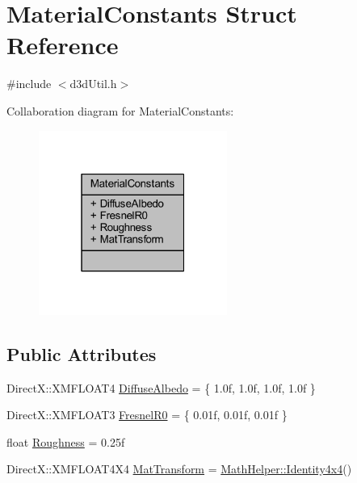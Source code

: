 \hypertarget{struct_material_constants}{}\section{Material\+Constants Struct Reference}
\label{struct_material_constants}


{\ttfamily \#include $<$d3d\+Util.\+h$>$}



Collaboration diagram for Material\+Constants\+:\nopagebreak
\begin{figure}[H]
\begin{center}
\leavevmode
\includegraphics[width=175pt]{struct_material_constants__coll__graph}
\end{center}
\end{figure}
\subsection*{Public Attributes}
\begin{DoxyCompactItemize}
\item 
Direct\+X\+::\+X\+M\+F\+L\+O\+A\+T4 \hyperlink{struct_material_constants_a83cf6d979493301808d0e4b350c3e0a4_a83cf6d979493301808d0e4b350c3e0a4}{Diffuse\+Albedo} = \{ 1.\+0f, 1.\+0f, 1.\+0f, 1.\+0f \}
\item 
Direct\+X\+::\+X\+M\+F\+L\+O\+A\+T3 \hyperlink{struct_material_constants_a7b2282a2a351b4327324fc7456a1cd85_a7b2282a2a351b4327324fc7456a1cd85}{Fresnel\+R0} = \{ 0.\+01f, 0.\+01f, 0.\+01f \}
\item 
float \hyperlink{struct_material_constants_ab931870a28dc4f2afdf7d6f565d06659_ab931870a28dc4f2afdf7d6f565d06659}{Roughness} = 0.\+25f
\item 
Direct\+X\+::\+X\+M\+F\+L\+O\+A\+T4\+X4 \hyperlink{struct_material_constants_a5d631fb90e1b2557008841d059c322c8_a5d631fb90e1b2557008841d059c322c8}{Mat\+Transform} = \hyperlink{class_math_helper_a68b4e9af95b1a36aad30ea80839f6b19_a68b4e9af95b1a36aad30ea80839f6b19}{Math\+Helper\+::\+Identity4x4}()
\end{DoxyCompactItemize}


